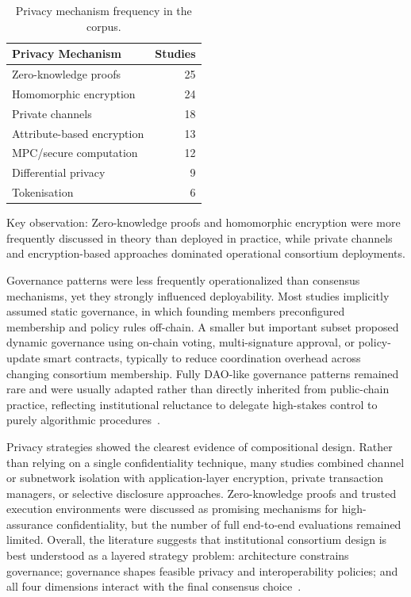 \documentclass[journal]{IEEEtran}
\begin{document}
\begin{table}[h]
\centering
\small
\begin{tabular}{lr}
\toprule
\textbf{Privacy Mechanism} & \textbf{Studies} \\
\midrule
Zero-knowledge proofs & 25 \\
Homomorphic encryption & 24 \\
Private channels & 18 \\
Attribute-based encryption & 13 \\
MPC/secure computation & 12 \\
Differential privacy & 9 \\
Tokenisation & 6 \\
\bottomrule
\end{tabular}
\caption{Privacy mechanism frequency in the corpus.}
\label{tab:privacy-mechanisms}
\end{table}

\noindent Key observation: Zero-knowledge proofs and homomorphic encryption were more frequently discussed in theory than deployed in practice, while private channels and encryption-based approaches dominated operational consortium deployments.

Governance patterns were less frequently operationalized than consensus mechanisms, yet they strongly influenced deployability. Most studies implicitly assumed static governance, in which founding members preconfigured membership and policy rules off-chain. A smaller but important subset proposed dynamic governance using on-chain voting, multi-signature approval, or policy-update smart contracts, typically to reduce coordination overhead across changing consortium membership. Fully DAO-like governance patterns remained rare and were usually adapted rather than directly inherited from public-chain practice, reflecting institutional reluctance to delegate high-stakes control to purely algorithmic procedures~\cite{beck2018governance,reijers2021governance,hassan2019blockchain}.

Privacy strategies showed the clearest evidence of compositional design. Rather than relying on a single confidentiality technique, many studies combined channel or subnetwork isolation with application-layer encryption, private transaction managers, or selective disclosure approaches. Zero-knowledge proofs and trusted execution environments were discussed as promising mechanisms for high-assurance confidentiality, but the number of full end-to-end evaluations remained limited. Overall, the literature suggests that institutional consortium design is best understood as a layered strategy problem: architecture constrains governance; governance shapes feasible privacy and interoperability policies; and all four dimensions interact with the final consensus choice~\cite{benhamouda2020can,zhang2021surveytee,dziembowski2018fairswap}.
\end{document}
